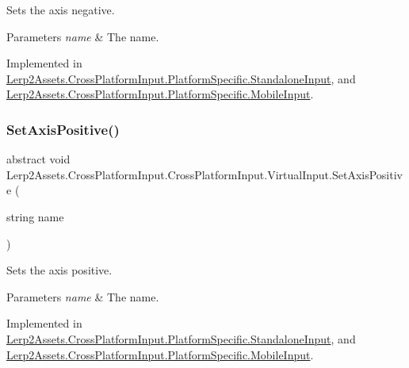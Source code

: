 Sets the axis negative. 


\begin{DoxyParams}{Parameters}
{\em name} & The name.\\
\hline
\end{DoxyParams}


Implemented in \hyperlink{class_lerp2_assets_1_1_cross_platform_input_1_1_platform_specific_1_1_standalone_input_a41a2db3d47fbc9c320551d32e0f9c187}{Lerp2\+Assets.\+Cross\+Platform\+Input.\+Platform\+Specific.\+Standalone\+Input}, and \hyperlink{class_lerp2_assets_1_1_cross_platform_input_1_1_platform_specific_1_1_mobile_input_a97c5a5b9836a920ab604f6b9d9cad41f}{Lerp2\+Assets.\+Cross\+Platform\+Input.\+Platform\+Specific.\+Mobile\+Input}.

\mbox{\label{class_lerp2_assets_1_1_cross_platform_input_1_1_cross_platform_input_1_1_virtual_input_a5a8ad2347e4e25f7ccd55939346e1b69}} 
\subsubsection{\texorpdfstring{Set\+Axis\+Positive()}{SetAxisPositive()}}
{\footnotesize\ttfamily abstract void Lerp2\+Assets.\+Cross\+Platform\+Input.\+Cross\+Platform\+Input.\+Virtual\+Input.\+Set\+Axis\+Positive (\begin{DoxyParamCaption}\item[{string}]{name }\end{DoxyParamCaption})\hspace{0.3cm}{\ttfamily [pure virtual]}}



Sets the axis positive. 


\begin{DoxyParams}{Parameters}
{\em name} & The name.\\
\hline
\end{DoxyParams}


Implemented in \hyperlink{class_lerp2_assets_1_1_cross_platform_input_1_1_platform_specific_1_1_standalone_input_a4712f03e0dab60dca4eb97b6d1b82f1b}{Lerp2\+Assets.\+Cross\+Platform\+Input.\+Platform\+Specific.\+Standalone\+Input}, and \hyperlink{class_lerp2_assets_1_1_cross_platform_input_1_1_platform_specific_1_1_mobile_input_a3ad0a492b131832757f0877e3a599a4d}{Lerp2\+Assets.\+Cross\+Platform\+Input.\+Platform\+Specific.\+Mobile\+Input}.

